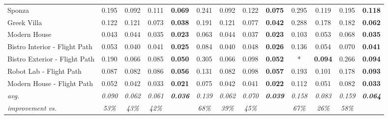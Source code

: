 \begin{table*}[t]
\begin{tabular}{l cccc|cccc|cccc}
Sponza                        & 0.195           & 0.092          & 0.111          & \textbf{0.069}          & 0.241           & 0.092          & 0.122          & \textbf{0.075}          & 0.295           & 0.119          & 0.195          & \textbf{0.118}          \\
Greek Villa                   & 0.122           & 0.121          & 0.073          & \textbf{0.038}          & 0.191           & 0.121          & 0.077          & \textbf{0.042}          & 0.288           & 0.178          & 0.182          & \textbf{0.062}          \\
Modern House                  & 0.043           & 0.044          & 0.035          & \textbf{0.023}          & 0.063           & 0.044          & 0.037          & \textbf{0.023}          & 0.103           & 0.053          & 0.068          & \textbf{0.035}          \\
Bistro Interior - Flight Path & 0.053           & 0.040          & 0.041          & \textbf{0.025}          & 0.084           & 0.040          & 0.048          & \textbf{0.026}          & 0.136           & 0.054          & 0.070          & \textbf{0.041}          \\
Bistro Exterior - Flight Path & 0.190           & 0.066          & 0.085          & \textbf{0.050}          & 0.305           & 0.066          & 0.098          & \textbf{0.052}          & *               & \textbf{0.094} & 0.266          & \textbf{0.094}          \\
Robot Lab - Flight Path       & 0.087           & 0.082          & 0.086          & \textbf{0.056}          & 0.131           & 0.082          & 0.098          & \textbf{0.057}          & 0.193           & 0.101          & 0.178          & \textbf{0.093}          \\
Modern House - Flight Path    & 0.052           & 0.042          & 0.033          & \textbf{0.021}          & 0.075           & 0.042          & 0.041          & \textbf{0.022}          & 0.112           & 0.051          & 0.082          & \textbf{0.033}          \\
\hline
\textit{avg.}                 & \textit{0.090}  & \textit{0.062} & \textit{0.061} & \textit{\textbf{0.036}} & \textit{0.139}  & \textit{0.062} & \textit{0.070} & \textit{\textbf{0.039}} & \textit{0.158}  & \textit{0.083} & \textit{0.159} & \textit{\textbf{0.064}} \\
\textit{improvement vs.}      & \textit{53\%}   & \textit{43\%}  & \textit{42\%}  &                         & \textit{68\%}   & \textit{39\%}  & \textit{45\%}  &                         & \textit{67\%}   & \textit{26\%}  & \textit{58\%}  &                         \\

\end{tabular}
\end{table*}
